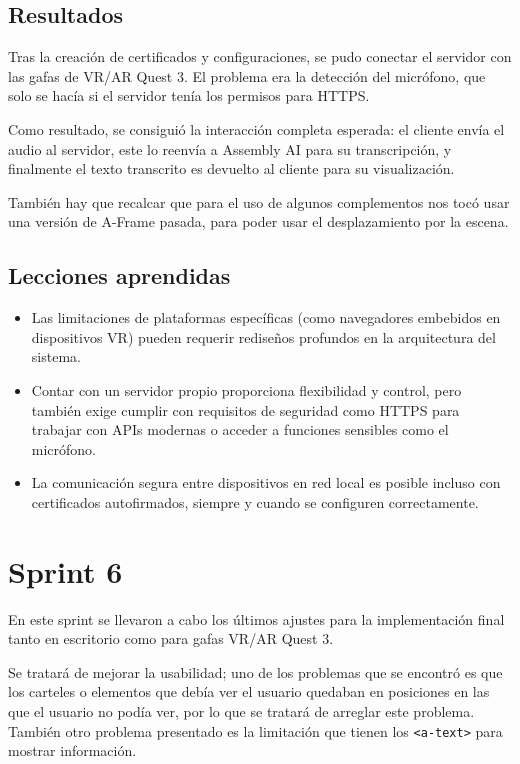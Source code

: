 \documentclass[a4paper, 12pt]{book}
\begin{document}
\subsection{Resultados}
Tras la creación de certificados y configuraciones, se pudo conectar el servidor con las gafas de VR/AR Quest 3. El problema era la detección del micrófono, que solo se hacía si el servidor tenía los permisos para HTTPS.

Como resultado, se consiguió la interacción completa esperada: el cliente envía el audio al servidor, este lo reenvía a Assembly AI para su transcripción, y finalmente el texto transcrito es devuelto al cliente para su visualización.

También hay que recalcar que para el uso de algunos complementos nos tocó usar una versión de A-Frame pasada, para poder usar el desplazamiento por la escena.
\subsection{Lecciones aprendidas}
\begin{itemize}
\setlength\itemsep{0.3em}  %
\setlength\parskip{0pt}    %
 \item Las limitaciones de plataformas específicas (como navegadores embebidos en dispositivos VR) pueden requerir rediseños profundos en la arquitectura del sistema.
 \item Contar con un servidor propio proporciona flexibilidad y control, pero también exige cumplir con requisitos de seguridad como HTTPS para trabajar con APIs modernas o acceder a funciones sensibles como el micrófono.
 \item La comunicación segura entre dispositivos en red local es posible incluso con certificados autofirmados, siempre y cuando se configuren correctamente.
\end{itemize}

 
\clearpage
\section{Sprint 6}
\label{sec:sprint6}

En este sprint se llevaron a cabo los últimos ajustes para la implementación final tanto en escritorio como para gafas VR/AR Quest 3.

Se tratará de mejorar la usabilidad; uno de los problemas que se encontró es que los carteles o elementos que debía ver el usuario quedaban en posiciones en las que el usuario no podía ver, por lo que se tratará de arreglar este problema.
También otro problema presentado es la limitación que tienen los \texttt{<a-text>} para mostrar información.
\end{document}
